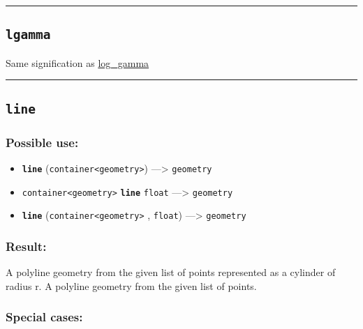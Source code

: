 \documentclass[]{book}
\providecommand{\tightlist}{%
  \setlength{\itemsep}{0pt}\setlength{\parskip}{0pt}}
\theoremstyle{definition}
\theoremstyle{definition}
\theoremstyle{definition}
\theoremstyle{remark}
\begin{document}
\begin{center}\rule{0.5\linewidth}{\linethickness}\end{center}

\subsection{\texorpdfstring{\texttt{lgamma}}{lgamma}}\label{lgamma}

Same signification as \href{OperatorsIM\#log_gamma}{log\_gamma}

\begin{center}\rule{0.5\linewidth}{\linethickness}\end{center}

\subsection{\texorpdfstring{\texttt{line}}{line}}\label{line}

\subsubsection{Possible use:}\label{possible-use-321}

\begin{itemize}
\tightlist
\item
  \textbf{\texttt{line}}
  (\texttt{container\textless{}geometry\textgreater{}})
  ---\textgreater{} \texttt{geometry}
\item
  \texttt{container\textless{}geometry\textgreater{}}
  \textbf{\texttt{line}} \texttt{float} ---\textgreater{}
  \texttt{geometry}
\item
  \textbf{\texttt{line}}
  (\texttt{container\textless{}geometry\textgreater{}} , \texttt{float})
  ---\textgreater{} \texttt{geometry}
\end{itemize}

\subsubsection{Result:}\label{result-311}

A polyline geometry from the given list of points represented as a
cylinder of radius r. A polyline geometry from the given list of points.

\subsubsection{Special cases:}\label{special-cases-88}
\end{document}
